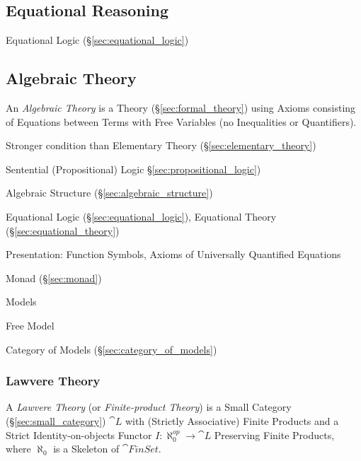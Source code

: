 \subsection{Equational Reasoning}\label{sec:equational_reasoning}

Equational Logic (\S\ref{sec:equational_logic})



\subsection{Algebraic Theory}\label{sec:algebraic_theory}

An \emph{Algebraic Theory} is a Theory (\S\ref{sec:formal_theory})
using Axioms consisting of Equations between Terms with Free Variables
(no Inequalities or Quantifiers).

Stronger condition than Elementary Theory
(\S\ref{sec:elementary_theory})

Sentential (Propositional) Logic \S\ref{sec:propositional_logic})

Algebraic Structure (\S\ref{sec:algebraic_structure})

Equational Logic (\S\ref{sec:equational_logic}),
Equational Theory (\S\ref{sec:equational_theory})

Presentation: Function Symbols, Axioms of Universally Quantified
Equations

Monad (\S\ref{sec:monad})

Models

Free Model

Category of Models (\S\ref{sec:category_of_models})



\subsubsection{Lawvere Theory}\label{sec:lawvere_theory}

A \emph{Lawvere Theory} (or \emph{Finite-product Theory}) is a Small
Category (\S\ref{sec:small_category}) $\cat{L}$ with (Strictly
Associative) Finite Products and a Strict Identity-on-objects Functor
$I : \aleph_0^{op} \rightarrow \cat{L}$ Preserving Finite Products,
where $\aleph_0$ is a Skeleton of $\cat{FinSet}$.

